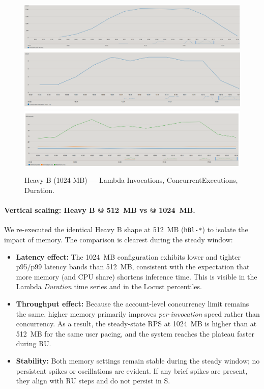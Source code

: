 \documentclass[11pt,a4paper]{article}
\begin{document}
\begin{figure}[h!] \centering
  \includegraphics[width=.32\linewidth]{"figures/hB - Invocations.png"}\hfill
  \includegraphics[width=.32\linewidth]{"figures/hB - ConcEx.png"}\hfill
  \includegraphics[width=.32\linewidth]{"figures/hB - Duration.png"}
  \caption{Heavy B (1024 MB) --- Lambda Invocations, ConcurrentExecutions, Duration.}
\end{figure}

\paragraph{Vertical scaling: Heavy B @ \SI{512}{MB} vs @ \SI{1024}{MB}.}
We re-executed the identical Heavy B shape at \SI{512}{MB} (\texttt{hBl-*}) to isolate the impact of memory. The comparison is clearest during the steady window:
\begin{itemize}
  \item \textbf{Latency effect:} The \SI{1024}{MB} configuration exhibits lower and tighter p95/p99 latency bands than \SI{512}{MB}, consistent with the expectation that more memory (and CPU share) shortens inference time. This is visible in the Lambda \emph{Duration} time series and in the Locust percentiles.
  \item \textbf{Throughput effect:} Because the account-level concurrency limit remains the same, higher memory primarily improves \emph{per-invocation} speed rather than concurrency. As a result, the steady-state RPS at \SI{1024}{MB} is higher than at \SI{512}{MB} for the same user pacing, and the system reaches the plateau faster during RU.
  \item \textbf{Stability:} Both memory settings remain stable during the steady window; no persistent spikes or oscillations are evident. If any brief spikes are present, they align with RU steps and do not persist in S.
\end{itemize}
\end{document}

